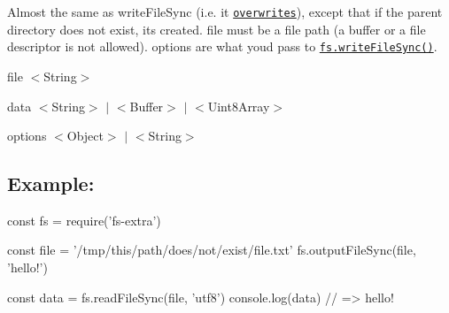 Almost the same as {\ttfamily write\+File\+Sync} (i.\+e. it \href{http://pages.citebite.com/v2o5n8l2f5reb}{\tt overwrites}), except that if the parent directory does not exist, it\textquotesingle{}s created. {\ttfamily file} must be a file path (a buffer or a file descriptor is not allowed). {\ttfamily options} are what you\textquotesingle{}d pass to \href{https://nodejs.org/api/fs.html#fs_fs_writefilesync_file_data_options}{\tt {\ttfamily fs.\+write\+File\+Sync()}}.


\begin{DoxyItemize}
\item {\ttfamily file} {\ttfamily $<$String$>$}
\item {\ttfamily data} {\ttfamily $<$String$>$ $\vert$ $<$Buffer$>$ $\vert$ $<$Uint8\+Array$>$}
\item {\ttfamily options} {\ttfamily $<$Object$>$ $\vert$ $<$String$>$}
\end{DoxyItemize}

\subsection*{Example\+:}


\begin{DoxyCode}
const fs = require('fs-extra')

const file = '/tmp/this/path/does/not/exist/file.txt'
fs.outputFileSync(file, 'hello!')

const data = fs.readFileSync(file, 'utf8')
console.log(data) // => hello!
\end{DoxyCode}
 